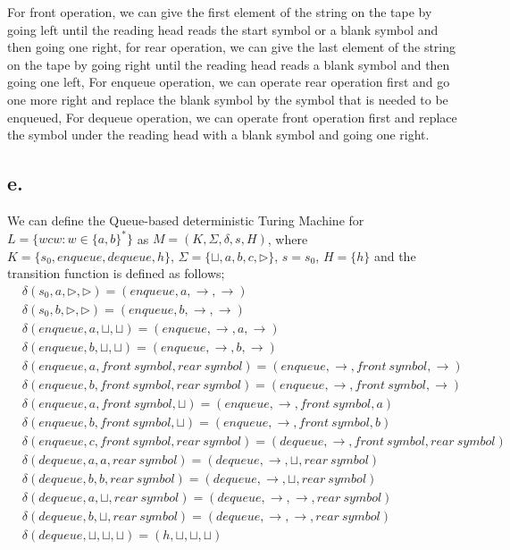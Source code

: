 \documentclass[12pt]{article}
\begin{document}
For front operation, we can give the first element of the string on the tape by going left until the reading head reads the start symbol or a blank symbol and then going one right, for rear operation, we can give the last element of the string on the tape by going right until the reading head reads a blank symbol and then going one left, For enqueue operation, we can operate rear operation first and go one more right and replace the blank symbol by the symbol that is needed to be enqueued, For dequeue operation, we can operate front operation first and replace the symbol under the reading head with a blank symbol and going one right. 

\subsection*{e.}
We can define the Queue-based deterministic Turing Machine for $L = \{wcw : w \in \{a,b\}^*\}$ as $M = (K,\Sigma,\delta, s, H)$, where
$K = \{s_0,enqueue,dequeue,h\}$, $\Sigma = \{\sqcup,a,b,c,\triangleright\}$, $s = s_0$, $H = \{h\}
$ and the transition function is defined as follows;
\begin{align*}
&\delta(s_0,a,\triangleright,\triangleright) = (enqueue,a,\rightarrow,\rightarrow)\\
&\delta(s_0,b,\triangleright,\triangleright) = (enqueue,b,\rightarrow,\rightarrow)\\
&\delta(enqueue,a,\sqcup,\sqcup) = (enqueue,\rightarrow,a,\rightarrow)\\
&\delta(enqueue,b,\sqcup,\sqcup) = (enqueue,\rightarrow,b,\rightarrow)\\
&\delta(enqueue,a,front \ symbol,rear \ symbol) = (enqueue,\rightarrow,front \ symbol,\rightarrow)\\
&\delta(enqueue,b,front \ symbol,rear \ symbol) = (enqueue,\rightarrow,front \ symbol,\rightarrow)\\
&\delta(enqueue,a,front \ symbol,\sqcup) = (enqueue,\rightarrow,front \ symbol,a)\\
&\delta(enqueue,b,front \ symbol,\sqcup) = (enqueue,\rightarrow,front \ symbol,b)\\
&\delta(enqueue,c,front \ symbol,rear \ symbol) = (dequeue,\rightarrow,front \ symbol,rear \ symbol)\\
&\delta(dequeue,a,a,rear \ symbol) = (dequeue,\rightarrow,\sqcup,rear \ symbol)\\
&\delta(dequeue,b,b,rear \ symbol) = (dequeue,\rightarrow,\sqcup,rear \ symbol)\\
&\delta(dequeue,a,\sqcup,rear \ symbol) = (dequeue,\rightarrow,\rightarrow,rear \ symbol)\\
&\delta(dequeue,b,\sqcup,rear \ symbol) = (dequeue,\rightarrow,\rightarrow,rear \ symbol)\\
&\delta(dequeue,\sqcup,\sqcup,\sqcup) = (h,\sqcup,\sqcup,\sqcup) \\
\end{align*}
\end{document}
